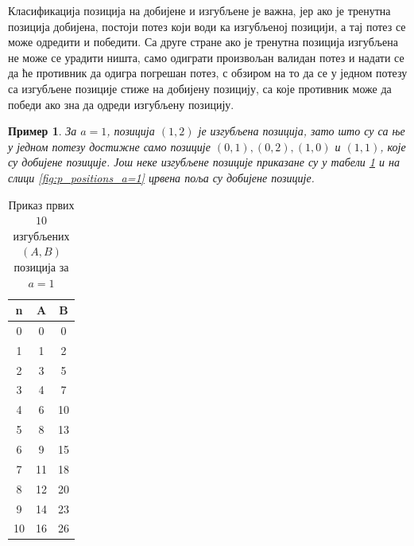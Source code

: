 \documentclass[a4paper]{article}
\newtheorem{example}{Пример}
\begin{document}
Класификација позиција на добијене и изгубљене је важна, јер ако је тренутна позиција добијена, постоји потез који води ка изгубљеној позицији, а тај потез се може одредити и победити. Са друге стране ако је тренутна позиција изгубљена не може се урадити ништа, само одиграти произвољан валидан потез и надати се да ће противник да одигра погрешан потез, с обзиром на то да се у једном потезу са изгубљене позиције стиже на добијену позицију, са које противник може да победи ако зна да одреди изгубљену позицију. 

\begin{example}
	За $ a = 1 $, позиција $ (1, 2) $ је изгубљена позиција, зато што су са ње у једном потезу достижне само позиције $ (0, 1), (0, 2), (1, 0) $ и $ (1, 1) $, које су добијене позиције. Још неке изгубљене позиције приказане су у табели \ref{tab:a_1_Ppozicije} и на слици \ref{fig:p_positions_a=1} црвена поља су добијене позиције. 
\end{example}
	
\begin{table}[h!]
	\caption{Приказ првих $ 10 $ изгубљених $ (A, B) $ позиција за $ a = 1 $}
	\label{tab:a_1_Ppozicije}
	\begin{center}
		\begin{tabular}{  c | c | c }
			{\textbf{n}} &  {\textbf{A}} &  {\textbf{B}} \\
			\hline
			0 & 0 & 0 \\
			1 & 1 & 2 \\
			2 & 3 & 5 \\
			3 & 4 & 7 \\
			4 & 6 & 10 \\
			5 & 8 & 13 \\
			6 & 9 & 15 \\
			7 & 11 & 18 \\
			8 & 12 & 20 \\
			9 & 14 & 23 \\
			10 & 16 & 26\\ 
		\end{tabular}
	\end{center}
\end{table}
\end{document}
